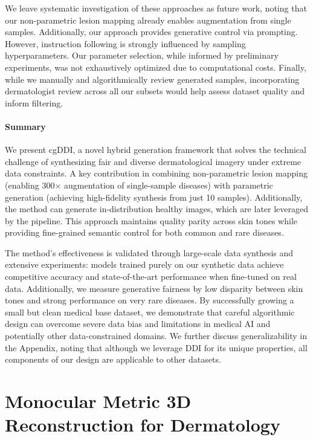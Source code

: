 \documentclass[11pt]{ucthesis}
\begin{document}
We leave systematic investigation of these approaches as future work, noting that our non-parametric lesion mapping already enables augmentation from single samples. Additionally, our approach provides generative control via prompting. However, instruction following is strongly influenced by sampling hyperparameters. Our parameter selection, while informed by preliminary experiments, was not exhaustively optimized due to computational costs. Finally, while we manually and algorithmically review generated samples, incorporating dermatologist review across all our subsets would help assess dataset quality and inform filtering.

\subsubsection{Summary}

We present cgDDI, a novel hybrid generation framework that solves the technical challenge of synthesizing fair and diverse dermatological imagery under extreme data constraints. A key contribution in combining non-parametric lesion mapping (enabling 300$\times$ augmentation of single-sample diseases) with parametric generation (achieving high-fidelity synthesis from just 10 samples). Additionally, the method can generate in-distribution healthy images, which are later leveraged by the pipeline. This approach maintains quality parity across skin tones while providing fine-grained semantic control for both common and rare diseases.

The method's effectiveness is validated through large-scale data synthesis and extensive experiments: models trained purely on our synthetic data achieve competitive accuracy and state-of-the-art performance when fine-tuned on real data. Additionally, we measure generative fairness by low disparity between skin tones and strong performance on very rare diseases. By successfully growing a small but clean medical base dataset, we demonstrate that careful algorithmic design can overcome severe data bias and limitations in medical AI and potentially other data-constrained domains. We further discuss generalizability in the Appendix, noting that although we leverage DDI for its unique properties, all components of our design are applicable to other datasets.


\chapter{Monocular Metric 3D Reconstruction for Dermatology}\label{section:dermdepth}
\end{document}

